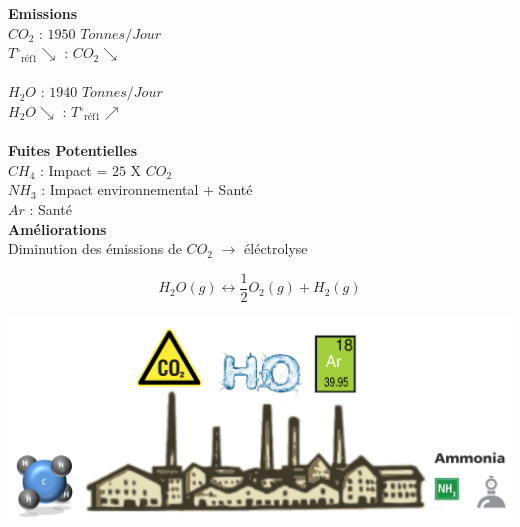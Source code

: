 \documentclass[landscape,a0paper,fontscale=0.285]{baposter} %
\begin{document}
\begin{poster}
{\begin{multicols}{2}
\textbf{Emissions}\\

$CO_{2}$ : $1950$  $Tonnes/Jour$ \\

$T\ensuremath{^\circ} _{\text{réf1}} \searrow$   :   $CO_{2}\searrow$\\
\\
$H_{2}O$   :   $1940$ $Tonnes/Jour$\\

$H_{2}O\searrow$   :   $T\ensuremath{^\circ} _{\text{réf1}} \nearrow$\\
\\
\textbf{Fuites Potentielles}\\
$CH_{4}$ :
Impact =  $25$ X $CO_{2}$\\

$NH_{3}$ : Impact environnemental + Santé   \\

$Ar$ : Santé \\


\textbf{Améliorations}\\

Diminution des émissions de $CO_{2}$ $\rightarrow $ éléctrolyse 

\[ H_{2}O(g) \leftrightarrow \frac{1}{2}  O_{2}(g) + H_{2}(g) \]


\end{multicols}
\begin{center}
\includegraphics[width=0.6\linewidth]{usine}
\end{center}

}


\end{poster}
\end{document}
